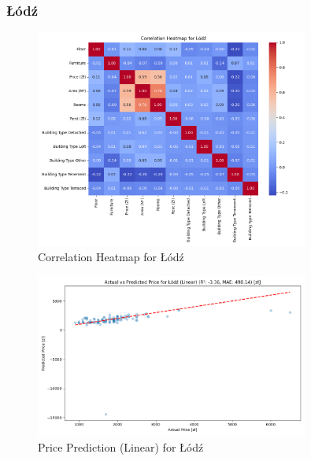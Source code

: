 \subsubsection{Łódź}
\begin{figure}[H]
    \centering
    \includegraphics[width=0.8\textwidth]{figures/lodz_correlation_heatmap.png}
    \caption{Correlation Heatmap for Łódź}
\end{figure}
\begin{figure}[H]
    \centering
    \includegraphics[width=0.8\textwidth]{figures/lodz_price_prediction_linear.png}
    \caption{Price Prediction (Linear) for Łódź}
\end{figure}

